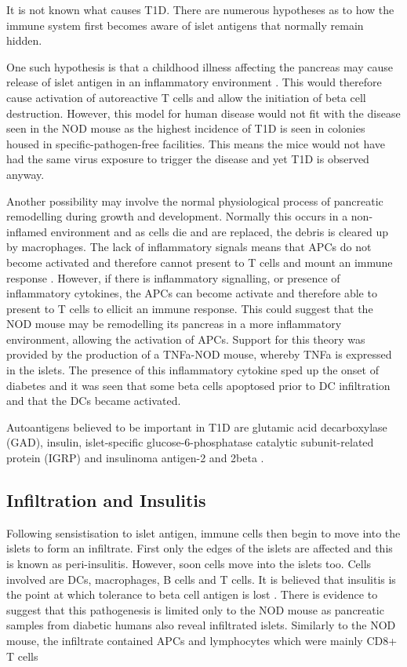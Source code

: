 It is not known what causes T1D.
There are numerous hypotheses as to how the immune system first becomes aware of islet antigens that normally remain hidden.


One such hypothesis is that a childhood illness affecting the pancreas may cause release of islet antigen in an inflammatory environment \citep{Green1999}.
This would therefore cause activation of autoreactive T cells and allow the initiation of beta cell destruction.
However, this model for human disease would not fit with the disease seen in the NOD mouse as the highest incidence of T1D is seen in colonies housed in specific-pathogen-free facilities\citep{Delovitch1997}.
This means the mice would not have had the same virus exposure to trigger the disease and yet T1D is observed anyway.

Another possibility may involve the normal physiological process of pancreatic remodelling during growth and development.
Normally this occurs in a non-inflamed environment and as cells die and are replaced, the debris is cleared up by macrophages.
The lack of inflammatory signals means that APCs do not become activated and therefore cannot present to T cells and mount an immune response \citep{Green1999}.
However, if there is inflammatory signalling, or presence of inflammatory cytokines, the APCs can become activate and therefore able to present to T cells to ellicit an immune response.
This could suggest that the NOD mouse may be remodelling its pancreas in a more inflammatory environment, allowing the activation of APCs.
Support for this theory was provided by the production of a TNFa-NOD mouse, whereby TNFa is expressed in the islets.
The presence of this inflammatory cytokine sped up the onset of diabetes and it was seen that some beta cells apoptosed prior to DC infiltration and that the DCs became activated\citep{Green1998}.

Autoantigens believed to be important in T1D are glutamic acid decarboxylase (GAD), insulin, islet-specific glucose-6-phosphatase catalytic subunit-related protein (IGRP) and insulinoma antigen-2 and 2beta \citep{Green1999, Roep2012}.


\subsection{Infiltration and Insulitis}

Following sensistisation to islet antigen, immune cells then begin to move into the islets to form an infiltrate.
First only the edges of the islets are affected and this is known as peri-insulitis\citep{Thomas2000}.
However, soon cells move into the islets too.
Cells involved are DCs, macrophages, B cells and T cells\citep{Brodie2008}.
It is believed that insulitis is the point at which tolerance to beta cell antigen is lost \citep{Thomas2000}.
There is evidence to suggest that this pathogenesis is limited only to the NOD mouse as pancreatic samples from diabetic humans also reveal infiltrated islets.
Similarly to the NOD mouse, the infiltrate contained APCs and lymphocytes which were mainly CD8+ T cells \citep{Hanafusa2008}

